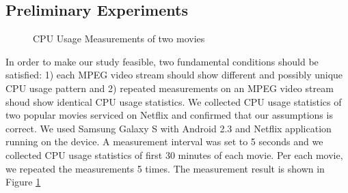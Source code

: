 \subsection{Preliminary Experiments}

\begin{figure}[!t]
	\centering
	\caption{CPU Usage Measurements of two movies}
	\label{fig:preliminaries}
	\vspace{-5mm}
\end{figure}

In order to make our study feasible, two fundamental conditions should be satisfied: 1) each MPEG video stream should show different and possibly unique CPU usage pattern and 2) repeated measurements on an MPEG video stream shoud show identical CPU usage statistics. 
We collected CPU usage statistics of two popular movies serviced on Netflix and confirmed that our assumptions is correct.
We used Samsung Galaxy S with Android 2.3 and Netflix application running on the device. 
A measurement interval was set to 5 seconds and we collected CPU usage statistics of first 30 minutes of each movie. 
Per each movie, we repeated the measurements 5 times. 
The measurement result is shown in Figure \ref{fig:preliminaries}

